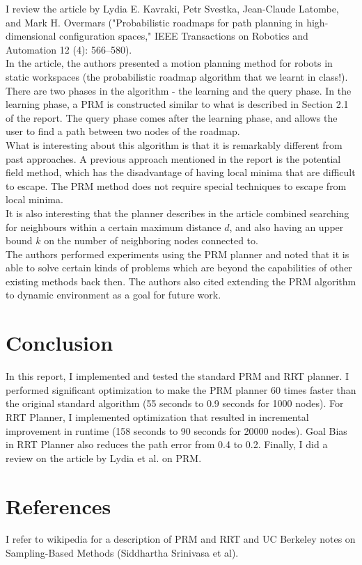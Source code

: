 \documentclass[9.5pt]{extarticle}
\begin{document}
I review the article by Lydia E. Kavraki, Petr Svestka, Jean-Claude Latombe, and Mark H. Overmars ("Probabilistic roadmaps for path planning in high-dimensional configuration spaces," IEEE Transactions on Robotics and Automation 12 (4): 566–580).\\

In the article, the authors presented a motion planning method for robots in static workspaces (the probabilistic roadmap algorithm that we learnt in class!). There are two phases in the algorithm - the learning and the query phase. In the learning phase, a PRM is constructed similar to what is described in Section 2.1 of the report. The query phase comes after the learning phase, and allows the user to find a path between two nodes of the roadmap.\\

What is interesting about this algorithm is that it is remarkably different from past approaches. A previous approach mentioned in the report is the potential field method, which has the disadvantage of having local minima that are difficult to escape. The PRM method does not require special techniques to escape from local minima.\\

It is also interesting that the planner describes in the article combined searching for neighbours within a certain maximum distance $d$, and also having an upper bound $k$ on the number of neighboring nodes connected to.\\

The authors performed experiments using the PRM planner and noted that it is able to solve certain kinds of problems which are beyond the capabilities of other existing methods back then. The authors also cited extending the PRM algorithm to dynamic environment as a goal for future work.\\

\section{Conclusion}

In this report, I implemented and tested the standard PRM and RRT planner. I performed significant optimization to make the PRM planner 60 times faster than the original standard algorithm (55 seconds to 0.9 seconds for 1000 nodes). For RRT Planner, I implemented optimization that resulted in incremental improvement in runtime (158 seconds to 90 seconds for 20000 nodes). Goal Bias in RRT Planner also reduces the path error from 0.4 to 0.2. Finally, I did a review on the article by Lydia et al. on PRM.

\section{References}

I refer to wikipedia for a description of PRM and RRT and UC Berkeley notes on Sampling-Based Methods (Siddhartha Srinivasa et al).
\end{document}
